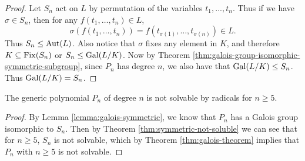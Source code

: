 \begin{proof}
	
	Let $S_n$ act on $L$ by permutation of the variables $t_1,...,t_n$. Thus if we have $\sigma \in S_n$, then for any $f(t_1,\dots,t_n) \in L $, 
	$$   \sigma( f(t_1, \dots, t_n) )=f( t_{\sigma(1)},\dots,t_{\sigma(n)}) \in L. $$
	Thus $S_n \le \operatorname{Aut}(L)$.  Also notice that $\sigma$ fixes any element in $K$, and therefore $K \subseteq \operatorname{Fix}(S_n)$ or $S_n \le \operatorname{Gal}(L/K)$. Now by Theorem \ref{thm:galois-group-isomorphic-symmetric-subgroup}, since $P_n$ has degree $n$, we also have that $\operatorname{Gal}(L/K) \le S_n$. Thus $\operatorname{Gal}(L/K) = S_n$. 
	
%	
	
\end{proof}


\begin{theorem}\label{thm:abel-ruffini-thm}
	The generic polynomial $P_n$ of degree $n$ is not solvable by radicals for $n \ge 5$. 
\end{theorem}

\begin{proof}
	By Lemma \ref{lemma:galois-symmetric}, we know that $P_n$ has a Galois group isomorphic to $S_n$. Then by Theorem \ref{thm:symmetric-not-soluble} we can see that for $n \geq 5$, $S_n$ is not solvable, which by Theorem \ref{thm:galois-theorem} implies that $P_n$ with $n \ge 5$ is not solvable.
\end{proof}

